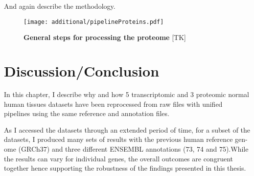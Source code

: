 And again describe the methodology.

  \begin{figure}
      \texttt{[image: additional/pipelineProteins.pdf]}\centering
      \caption[General steps for processing the proteome
      data]{\label{fig:pipelineProt}\textbf{General steps for processing the
      proteome} [TK] }
  \end{figure}

\section{Discussion/Conclusion}

In this chapter, I describe why and how 5 transcriptomic and 3 proteomic normal
human tissues datasets have been reprocessed from raw files with unified
pipelines using the same reference and annotation files.

As I accessed the datasets through an extended period of time, for a subset of the datasets, I produced many sets of results with the previous human reference gen- ome (GRCh37) and three different ENSEMBL annotations (73, 74 and 75).While the results can vary for individual genes, the overall outcomes are congruent together hence supporting the robustness of the findings presented in this thesis.



